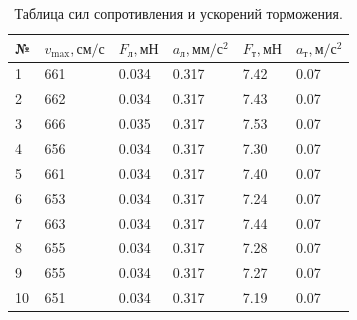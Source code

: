 \documentclass[12pt]{article}
\begin{document}
\begin{table}[h!]
\centering
\begin{tabular}{ |p{0.6cm}|p{1.9cm}|p{1.9cm}|p{1.9cm}|p{1.9cm}|p{1.9cm}| }
\hline
№ & $v _{\max} , \text{см}/\text{с}$& $F_\text{л}, \text{мН}$&$a_\text{л}, \text{мм}/\text{с}^2$&$F_\text{т}, \text{мН}$&$a_\text{т}, \text{м}/\text{с}^2$\\
\hline
1& 661& 0.034 & 0.317 & 7.42 & 0.07\\
\hline
2& 662& 0.034 & 0.317 & 7.43 & 0.07\\
\hline
3& 666& 0.035 & 0.317 & 7.53 & 0.07\\
\hline
4& 656& 0.034 & 0.317 & 7.30 & 0.07\\
\hline
5& 661& 0.034 & 0.317 & 7.40 & 0.07\\
\hline
6& 653& 0.034 & 0.317 & 7.24 & 0.07\\
\hline
7& 663& 0.034 & 0.317 & 7.44 & 0.07\\
\hline
8& 655& 0.034 & 0.317 & 7.28 & 0.07\\
\hline
9& 655& 0.034 & 0.317 & 7.27 & 0.07\\
\hline
10& 651& 0.034 & 0.317 & 7.19 & 0.07\\
\hline
\end{tabular}
\caption{Таблица сил сопротивления и ускорений торможения.}
\end{table}
\newpage
\end{document}
